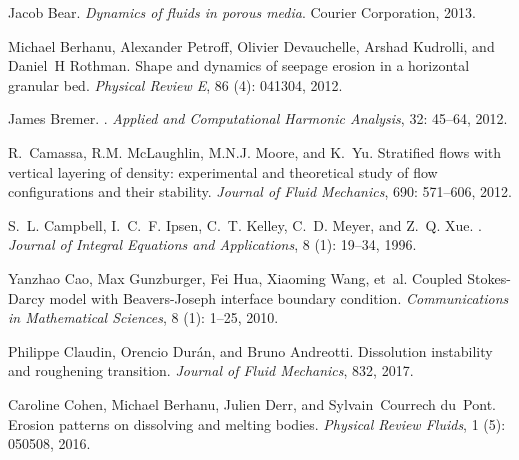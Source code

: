 \documentclass[preprint, 10pt]{elsarticle}
\begin{document}
\begin{thebibliography}{72}
Jacob Bear.
\newblock \emph{Dynamics of fluids in porous media}.
\newblock Courier Corporation, 2013.

Michael Berhanu, Alexander Petroff, Olivier Devauchelle, Arshad Kudrolli, and
  Daniel~H Rothman.
\newblock Shape and dynamics of seepage erosion in a horizontal granular bed.
\newblock \emph{Physical Review E}, 86 (4): 041304, 2012.

James Bremer.
.
\newblock \emph{Applied and Computational Harmonic Analysis}, 32:
  45--64, 2012.

R.~Camassa, R.M. McLaughlin, M.N.J. Moore, and K.~Yu.
\newblock Stratified flows with vertical layering of density: experimental and
  theoretical study of flow configurations and their stability.
\newblock \emph{Journal of Fluid Mechanics}, 690: 571--606, 2012.

S.~L. Campbell, I.~C.~F. Ipsen, C.~T. Kelley, C.~D. Meyer, and Z.~Q. Xue.
.
\newblock \emph{Journal of Integral Equations and Applications}, 8
  (1): 19--34, 1996.

Yanzhao Cao, Max Gunzburger, Fei Hua, Xiaoming Wang, et~al.
\newblock Coupled Stokes-Darcy model with Beavers-Joseph interface boundary
  condition.
\newblock \emph{Communications in Mathematical Sciences}, 8
  (1): 1--25, 2010.

Philippe Claudin, Orencio Dur{\'a}n, and Bruno Andreotti.
\newblock Dissolution instability and roughening transition.
\newblock \emph{Journal of Fluid Mechanics}, 832, 2017.

Caroline Cohen, Michael Berhanu, Julien Derr, and Sylvain~Courrech du~Pont.
\newblock Erosion patterns on dissolving and melting bodies.
\newblock \emph{Physical Review Fluids}, 1 (5): 050508, 2016.


\end{thebibliography}
\end{document}
